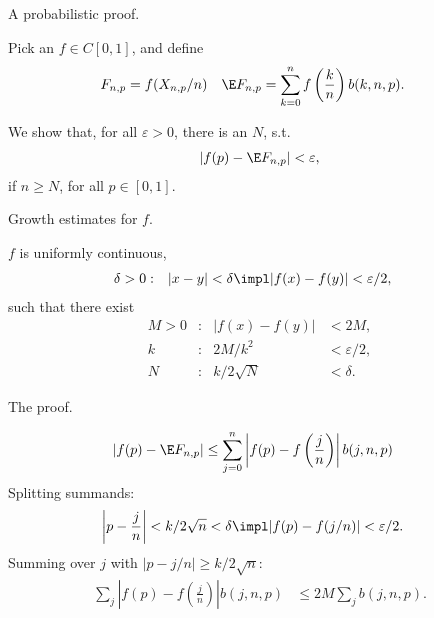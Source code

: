 \begin{frame}
    {A probabilistic proof. }
    
    Pick an $f \in C[0,1]$, and define 
    \begin{align*}
        F_{n,p} &= f(X_{n,p}/n) &
        \E F_{n,p} &= \sum_{k=0}^{n} f\left( \frac{k}{n} \right) b(k,n,p).
    \end{align*}

    We show that, for all $\varepsilon>0$, there is an $N$, s.t.\
    \begin{align*}
        | f(p) - \E F_{n,p} | < \varepsilon,  
    \end{align*}
    if $n \geq N$, for all $p\in[0,1]$.
\end{frame}

\begin{frame}
    {Growth estimates for $f$. }
    
    $f$ is uniformly continuous, 
    \begin{align*}
        \delta>0 &:& |x-y| &<\delta \impl |f(x)-f(y)| < \varepsilon/2,
    \end{align*}
    such that there exist
    \begin{align*}
        M > 0 &:& | f(x) - f(y) | &< 2M, \\
        k &:& 2M/k^2 &< \varepsilon/2, \\
        N &:& k/2\sqrt{N} &< \delta.
    \end{align*}
\end{frame}

\begin{frame}
    {The proof.}
    
    \begin{align*}
        |f(p) - \E F_{n,p}| & \leq \sum_{j=0}^{n} 
        \left| f(p)-f\left(\frac{j}{n}\right) \right| b(j,n,p)
    \end{align*}
    Splitting summands: 
    \begin{align*}
        \left| p - \frac{j}{n} \right| &< k/2\sqrt{n}<\delta 
        \impl |f(p)-f(j/n)| < \varepsilon/2.
    \end{align*}
    Summing over $j$ with $|p - j/n | \geq k/2\sqrt{n}$:
    \begin{align*}
        \sum_{j} \left| f(p)-f\left(\frac{j}{n}\right) \right| b(j,n,p) & \leq 
        2M \sum_{j} b(j,n,p).
    \end{align*}
\end{frame}

